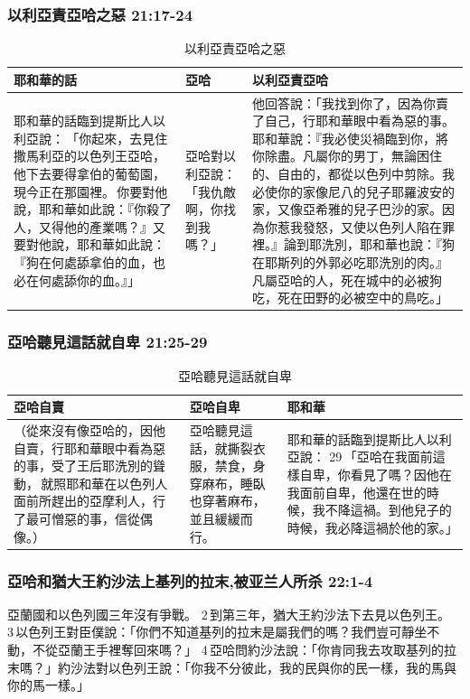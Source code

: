 \subsubsection{以利亞責亞哈之惡 21:17-24}
\begin{table}[H]
\centering 
{}
\begin{tabular}{p{6.5cm}|p{1.25cm}|p{9.5cm}}\hline\hline
耶和華的話&亞哈&以利亞責亞哈\\\hline
耶和華的話臨到提斯比人以利亞說： 「你起來，去見住撒馬利亞的以色列王亞哈，他下去要得拿伯的葡萄園，現今正在那園裡。 你要對他說，耶和華如此說：『你殺了人，又得他的產業嗎？』又要對他說，耶和華如此說：『狗在何處舔拿伯的血，也必在何處舔你的血。』」
&亞哈對以利亞說：「我仇敵啊，你找到我嗎？」&他回答說：「我找到你了，因為你賣了自己，行耶和華眼中看為惡的事。耶和華說：『我必使災禍臨到你，將你除盡。凡屬你的男丁，無論困住的、自由的，都從以色列中剪除。我必使你的家像尼八的兒子耶羅波安的家，又像亞希雅的兒子巴沙的家。因為你惹我發怒，又使以色列人陷在罪裡。』論到耶洗別，耶和華也說：『狗在耶斯列的外郭必吃耶洗別的肉。』凡屬亞哈的人，死在城中的必被狗吃，死在田野的必被空中的鳥吃。」\\\hline
\end{tabular}
\caption{以利亞責亞哈之惡}
\end{table} 


\subsubsection{亞哈聽見這話就自卑 21:25-29}
\begin{table}[H]
\centering 
{}
\begin{tabular}{p{6.5cm}|p{3.25cm}|p{}}\hline\hline
亞哈自賣&亞哈自卑&耶和華\\\hline
（從來沒有像亞哈的，因他自賣，行耶和華眼中看為惡的事，受了王后耶洗別的聳動， 就照耶和華在以色列人面前所趕出的亞摩利人，行了最可憎惡的事，信從偶像。）&亞哈聽見這話，就撕裂衣服，禁食，身穿麻布，睡臥也穿著麻布，並且緩緩而行。&耶和華的話臨到提斯比人以利亞說： 29 「亞哈在我面前這樣自卑，你看見了嗎？因他在我面前自卑，他還在世的時候，我不降這禍。到他兒子的時候，我必降這禍於他的家。」
\\\hline
\end{tabular}
\caption{亞哈聽見這話就自卑}
\end{table} 


\subsubsection{亞哈和猶大王約沙法上基列的拉末,被亚兰人所杀  22:1-4}
亞蘭國和以色列國三年沒有爭戰。 2 到第三年，猶大王約沙法下去見以色列王。 3 以色列王對臣僕說：「你們不知道基列的拉末是屬我們的嗎？我們豈可靜坐不動，不從亞蘭王手裡奪回來嗎？」 4 亞哈問約沙法說：「你肯同我去攻取基列的拉末嗎？」約沙法對以色列王說：「你我不分彼此，我的民與你的民一樣，我的馬與你的馬一樣。」

